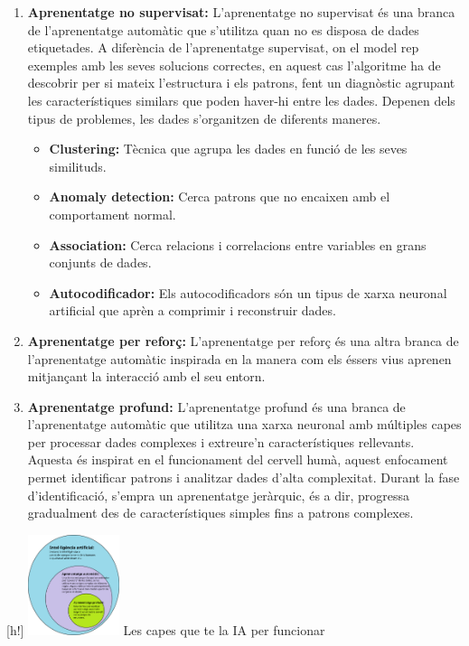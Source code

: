 \begin{enumerate}
\begin{enumerate}
        \item \textbf{Aprenentatge no supervisat:}
        L'aprenentatge no supervisat és una branca de l'aprenentatge automàtic que s'utilitza quan no es disposa de dades etiquetades. A diferència de l'aprenentatge supervisat, on el model rep exemples amb les seves solucions correctes, en aquest cas l'algoritme ha de descobrir per si mateix l'estructura i els patrons, fent un diagnòstic agrupant les característiques similars que poden haver-hi entre les dades. Depenen dels tipus de problemes, les dades s'organitzen de diferents maneres.
        \begin{itemize}
            \item \textbf{Clustering:} Tècnica que agrupa les dades en funció de les seves similituds.
            \item \textbf{Anomaly detection:} Cerca patrons que no encaixen amb el comportament normal.
            \item \textbf{Association:} Cerca relacions i correlacions entre variables en grans conjunts de dades.
            \item \textbf{Autocodificador:} Els autocodificadors són un tipus de xarxa neuronal artificial que aprèn a comprimir i reconstruir dades.
        \end{itemize}

        \item \textbf{Aprenentatge per reforç:}
        L'aprenentatge per reforç és una altra branca de l'aprenentatge automàtic inspirada en la manera com els éssers vius aprenen mitjançant la interacció amb el seu entorn.

        \item \textbf{Aprenentatge profund:}
        L'aprenentatge profund és una branca de l'aprenentatge automàtic que utilitza una xarxa neuronal amb múltiples capes per processar dades complexes i extreure'n característiques rellevants. Aquesta és inspirat en el funcionament del cervell humà, aquest enfocament permet identificar patrons i analitzar dades d'alta complexitat. Durant la fase d'identificació, s'empra un aprenentatge jeràrquic, és a dir, progressa gradualment des de característiques simples fins a patrons complexes.

    \end{enumerate}

 \begin{center}[h!]
            \centering
            \includegraphics[width=0.2\textwidth]{./figures/Aprenentatge.png}
            \small{Les capes que te la IA per funcionar}
\end{center}


\end{enumerate}
